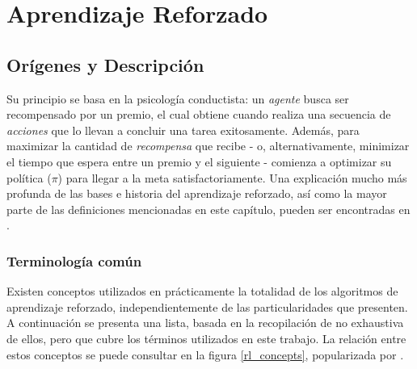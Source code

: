\chapter{Aprendizaje Reforzado}

\section{Or\'igenes y Descripci\'on}

Su principio se basa en la psicolog\'ia conductista: un \textit{agente} busca ser recompensado por un premio, el cual obtiene cuando realiza una secuencia de \textit{acciones} que lo llevan a concluir una tarea exitosamente. Adem\'as, para maximizar la cantidad de \textit{recompensa} que recibe - o, alternativamente, minimizar el tiempo que espera entre un premio y el siguiente - comienza a optimizar su pol\'itica (\textit{$\pi$}) para llegar a la meta satisfactoriamente. Una explicaci\'on mucho m\'as profunda de las bases e historia del aprendizaje reforzado, as\'i como la mayor parte de las definiciones mencionadas en este cap\'itulo, pueden ser encontradas en \citet{Sutton}.\\

\subsection{Terminolog\'ia com\'un}

Existen conceptos utilizados en pr\'acticamente la totalidad de los algoritmos de aprendizaje reforzado, independientemente de las particularidades que presenten. A continuaci\'on se presenta una lista, basada en la recopilaci\'on de \citet{rlexplained} no exhaustiva de ellos, pero que cubre los t\'erminos utilizados en este trabajo. La relaci\'on entre estos conceptos se puede consultar en la figura \ref{rl_concepts}, popularizada por \cite{Sutton}.

